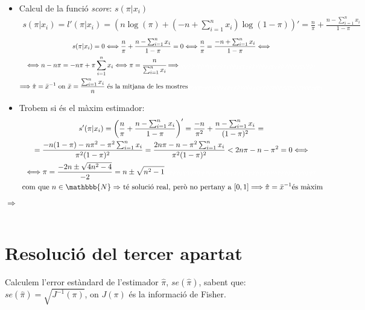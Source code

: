 \documentclass[12pt]{article}
\begin{document}
\begin{itemize}
\item Calcul de la funció \textit{score}: $s(\pi|x_i)$
\begin{align*}
s(\pi|x_i) = l'(\pi|x_i) = \left(n\log(\pi)+ \left(-n + \sum_{i=1}^n x_i\right)\log(1-\pi) \right)' = \frac{n}{\pi} +\frac{n - \sum_{i=1}^n x_i}{1-\pi}
\end{align*}
\begin{multline*}
s(\pi|x_i) = 0 \Longleftrightarrow \frac{n}{\pi} +\frac{n - \sum_{i=1}^n x_i}{1-\pi} = 0 \Longleftrightarrow \frac{n}{\pi} = \frac{-n + \sum_{i=1}^n x_i}{1-\pi} \Longleftrightarrow\\
\Longleftrightarrow n-n\pi = -n\pi +\pi\sum_{i=1}^n x_i \Longleftrightarrow \pi = \cfrac{n}{\sum_{i=1}^n x_i} \Longrightarrow \textcolor{white}{qqqqqqqqqqqqqqqqqqqqqqqqqqqqqqqqqqqqqqqqqq}\\
\Longrightarrow \hat{\pi} = \Bar{x}^{-1} \text{ on $\Bar{x}=\frac{\sum_{i=1}^n x_i}{n}$ és la mitjana de les mostres} \textcolor{white}{qqqqqqqqqqqqqqqqqqqqqqqqqqqqqqqqqqqqqqqqqq}
\end{multline*}
\newpage
\item Trobem si és el màxim estimador:
\begin{multline*}
s'(\pi|x_i) = \left( \frac{n}{\pi} +\frac{n - \sum_{i=1}^n x_i}{1-\pi} \right)' = \frac{-n}{\pi^2} + \frac{n - \sum_{i=1}^n x_i}{(1-\pi)^2} = \\ = \frac{-n(1-\pi)-n\pi^2-\pi^2\sum_{i=1}^n x_i}{\pi^2(1-\pi)^2} = \frac{2n\pi-n-\pi^2\sum_{i=1}^n x_i}{\pi^2(1-\pi)^2} < 2n\pi-n-\pi^2 = 0 \Longleftrightarrow \\
\Longleftrightarrow \pi = \frac{-2n \pm \sqrt{4n^2-4}}{-2} = n \pm \sqrt{n^2-1} \textcolor{white}{qqqqqqqqqqqqqqqqqqqqqqqqqqqqqqqqqqqqqqqqqq} \\ \text{ com que $n\in\mathbbb{N} \Rightarrow$ té solució real, però no pertany a $[0,1]$} \Longrightarrow \hat{\pi} = \Bar{x}^{-1} \text{és màxim}
\end{multline*}
\end{itemize}
\label{estimador}
$\Longrightarrow$ \\\\
\newpage

\section{Resolució del tercer apartat}
Calculem l'error estàndard de l'estimador $\hat{\pi}$, $se(\hat{\pi})$, sabent que: $se(\hat{\pi})=\sqrt{J^{-1}(\pi)}$, on $J(\pi)$ és la informació de Fisher.
\end{document}
